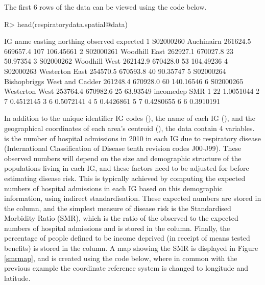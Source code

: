 \documentclass[article,shortnames,nojss]{jss}
\begin{document}
The first 6 rows of the data can be viewed using the code below.


\begin{Schunk}
\begin{Sinput}
R> head(respiratorydata.spatial@data)
\end{Sinput}
\begin{Soutput}
         IG                         name  easting northing observed  expected
1 S02000260                   Auchinairn 261624.5 669657.4      107 106.45661
2 S02000261                Woodhill East 262927.1 670027.8       23  50.97354
3 S02000262                Woodhill West 262142.9 670428.0       53 104.49236
4 S02000263               Westerton East 254570.5 670593.8       40  90.35747
5 S02000264 Bishopbriggs West and Cadder 261248.4 670928.0       60 140.16546
6 S02000265               Westerton West 253764.4 670982.6       25  63.93549
  incomedep       SMR
1        22 1.0051044
2         7 0.4512145
3         6 0.5072141
4         5 0.4426861
5         7 0.4280655
6         6 0.3910191
\end{Soutput}
\end{Schunk}

In addition to the unique identifier IG codes (), the name of each IG (), and the geographical coordinates of each area's centroid (), the data contain 4 variables.   is the  number of hospital admissions in 2010 in each IG due to respiratory disease (International Classification of Disease tenth revision codes J00-J99). These observed numbers will depend on the size and demographic structure of the populations living in each IG, and these factors need to be adjusted for before estimating disease risk. This is typically achieved  by computing the expected numbers of hospital admissions in each IG based on this demographic information, using indirect standardisation. These expected numbers are stored in the  column, and the simplest measure of disease risk is the Standardised Morbidity Ratio (SMR), which is the ratio of the observed to the expected numbers of hospital admissions and is stored in the  column. Finally, the percentage of people defined to be income deprived (in receipt of means tested benefits) is stored in the  column. A map showing the SMR is displayed in Figure \ref{smrmap}, and is created using the code below, where in common with the previous example the coordinate reference system is changed to longitude and latitude.
\end{document}

